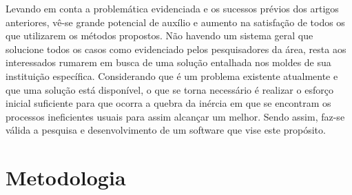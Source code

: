     Levando em conta a problemática evidenciada e os sucessos prévios dos artigos anteriores, vê-se grande potencial de auxílio e aumento na satisfação de todos os que utilizarem os métodos propostos. Não havendo um sistema geral que solucione todos os casos como evidenciado pelos pesquisadores da área, resta aos interessados rumarem em busca de uma solução entalhada nos moldes de sua instituição específica. Considerando que é um problema existente atualmente e que uma solução está disponível, o que se torna necessário é realizar o esforço inicial suficiente para que ocorra a quebra da inércia em que se encontram os processos ineficientes usuais para assim alcançar um melhor. Sendo assim, faz-se válida a pesquisa e desenvolvimento de um software que vise este propósito.


\section{Metodologia } %



